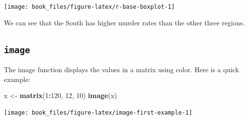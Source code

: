 \documentclass[
]{krantz}
\newenvironment{Shaded}{\begin{snugshade}}{\end{snugshade}}
\newcommand{\DataTypeTok}[1]{\textcolor[rgb]{0.27,0.27,0.27}{#1}}
\newcommand{\DecValTok}[1]{\textcolor[rgb]{0.06,0.06,0.06}{#1}}
\newcommand{\KeywordTok}[1]{\textcolor[rgb]{0.27,0.27,0.27}{\textbf{#1}}}
\newcommand{\NormalTok}[1]{#1}
\newcommand{\OperatorTok}[1]{\textcolor[rgb]{0.43,0.43,0.43}{\textbf{#1}}}
\newcommand{\StringTok}[1]{\textcolor[rgb]{0.5,0.5,0.5}{#1}}
\begin{document}
\begin{Shaded}
\end{Shaded}

\begin{Shaded}
\end{Shaded}

\begin{center}\texttt{[image: book\_files/figure-latex/r-base-boxplot-1]} \end{center}

We can see that the South has higher murder rates than the other three regions.

\hypertarget{image}{%
\subsection{\texorpdfstring{\texttt{image}}{image}}\label{image}}

The image function displays the values in a matrix using color. Here is a quick example:

\begin{Shaded}
\begin{Highlighting}[]
\NormalTok{x <-}\StringTok{ }\KeywordTok{matrix}\NormalTok{(}\DecValTok{1}\OperatorTok{:}\DecValTok{120}\NormalTok{, }\DecValTok{12}\NormalTok{, }\DecValTok{10}\NormalTok{)}
\KeywordTok{image}\NormalTok{(x)}
\end{Highlighting}
\end{Shaded}

\begin{center}\texttt{[image: book\_files/figure-latex/image-first-example-1]} \end{center}
\end{document}
